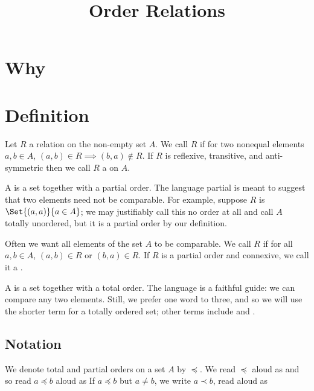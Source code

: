 






\title{Order Relations}

\section{Why}


\section{Definition}

Let $R$ a relation on the non-empty set $A$.
We call $R$  if for two nonequal elements $a, b \in A$, $(a, b) \in R \implies (b, a) \not\in R$.
If $R$ is reflexive, transitive, and anti-symmetric then we call $R$ a  on $A$.

A  is a set together with a partial order.
The language partial is meant to suggest that two elements need not be comparable.
For example, suppose $R$ is $\Set{(a,a)}{a \in A}$; we may justifiably call this no order at all and call $A$ totally unordered, but it is a partial order by our definition.

Often we want all elements of the set $A$ to be comparable.
We call $R$  if for all $a, b \in A$, $(a, b) \in R$ or $(b, a) \in R$.
If $R$ is a partial order and connexive, we call it a .


A  is a set together with a total order.
The language is a faithful guide: we can compare any two elements.
Still, we prefer one word to three, and so we will use the shorter term  for a totally ordered set; other terms include  and .

\subsection{Notation}
We denote total and partial orders on a set $A$ by $\preceq$.
We read $\preceq$ aloud as  and so read $a\preceq b$ aloud as 
If $a \preceq b$ but $a \neq b$, we write $a \prec b$, read aloud as 


